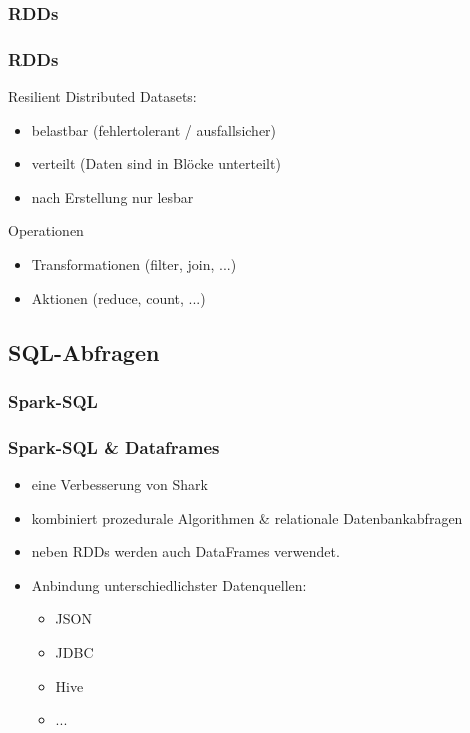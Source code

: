 \documentclass[hyperref={pdfpagelabels=false}]{beamer}
\begin{document}
\subsubsection{RDDs}
\begin{frame} [t]
\frametitle{RDDs}

Resilient Distributed Datasets:
\begin{itemize}
	\item belastbar (fehlertolerant / ausfallsicher)
	\item verteilt (Daten sind in Blöcke unterteilt)
	\item nach Erstellung nur lesbar	
\end{itemize}

\vspace{0.4cm}

Operationen
\begin{itemize}
	\item Transformationen (filter, join, ...)
	\item Aktionen (reduce, count, ...)
\end{itemize}

\end{frame}


\subsection{SQL-Abfragen}
\subsubsection{Spark-SQL}
\begin{frame} [t]
\frametitle{Spark-SQL \& Dataframes}
\begin{itemize}
	\item eine Verbesserung von Shark
	\item kombiniert prozedurale Algorithmen \& relationale Datenbankabfragen
	\item neben RDDs werden auch DataFrames verwendet.	
	\item Anbindung unterschiedlichster Datenquellen:
		
		
		\begin{itemize}
			\item JSON
			\item JDBC
			\item Hive
			\item ...
		\end{itemize}
		
\end{itemize}



\end{frame}
\end{document}
